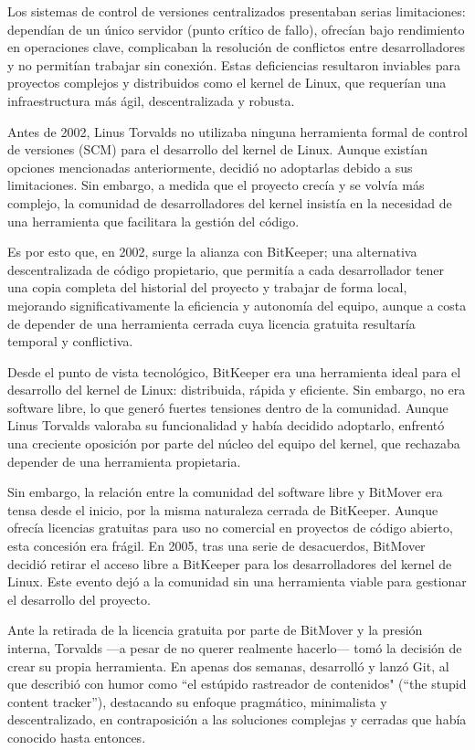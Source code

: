 \documentclass[a4paper,12pt]{article}
\begin{document}
Los sistemas de control de versiones centralizados presentaban serias
limitaciones: dependían de un único servidor (punto crítico de fallo), ofrecían
bajo rendimiento en operaciones clave, complicaban la resolución de conflictos
entre desarrolladores y no permitían trabajar sin conexión. Estas deficiencias
resultaron inviables para proyectos complejos y distribuidos como el kernel de
Linux, que requerían una infraestructura más ágil, descentralizada y robusta.

Antes de 2002, Linus Torvalds no utilizaba ninguna herramienta formal de control
de versiones (SCM) para el desarrollo del kernel de Linux. Aunque existían
opciones mencionadas anteriormente, decidió no adoptarlas debido a sus
limitaciones.  Sin embargo, a medida que el proyecto crecía y se volvía más
complejo, la comunidad de desarrolladores del kernel insistía en la necesidad de
una herramienta que facilitara la gestión del código.

Es por esto que, en 2002, surge la alianza con BitKeeper; una alternativa
descentralizada de código propietario, que permitía a cada desarrollador
tener una copia completa del historial del proyecto y trabajar de forma local,
mejorando significativamente la eficiencia y autonomía del equipo, aunque a
costa de depender de una herramienta cerrada cuya licencia gratuita resultaría
temporal y conflictiva.

Desde el punto de vista tecnológico, BitKeeper era una herramienta ideal para el
desarrollo del kernel de Linux: distribuida, rápida y eficiente. Sin embargo, no
era software libre, lo que generó fuertes tensiones dentro de la comunidad.
Aunque Linus Torvalds valoraba su funcionalidad y había decidido adoptarlo,
enfrentó una creciente oposición por parte del núcleo del equipo del kernel, que
rechazaba depender de una herramienta propietaria.

Sin embargo, la relación entre la comunidad del software libre y BitMover era
tensa desde el inicio, por la misma naturaleza cerrada de BitKeeper. Aunque
ofrecía licencias gratuitas para uso no comercial en proyectos de código
abierto, esta concesión era frágil. En 2005, tras una serie de desacuerdos,
BitMover decidió retirar el acceso libre a BitKeeper para los desarrolladores
del kernel de Linux. Este evento dejó a la comunidad sin una herramienta viable
para gestionar el desarrollo del proyecto.

Ante la retirada de la licencia gratuita por parte de BitMover y la presión
interna, Torvalds —a pesar de no querer realmente hacerlo— tomó la decisión de
crear su propia herramienta. En apenas dos semanas, desarrolló y lanzó Git, al
que describió con humor como ``el estúpido rastreador de contenidos" (“the stupid
content tracker”), destacando su enfoque pragmático, minimalista y
descentralizado, en contraposición a las soluciones complejas y cerradas que
había conocido hasta entonces.
\end{document}
